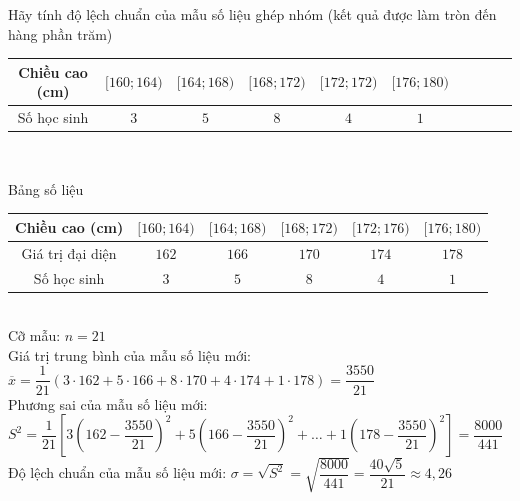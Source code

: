 \begin{ex}%
	Hãy tính độ lệch chuẩn của mẫu số liệu ghép nhóm (kết quả được làm tròn đến hàng phần trăm)\\
	\begin{tabular}{|c|c|c|c|c|c| c| c| c| c|  }
		\hline
		Chiều cao (cm) & $[160;164)$ & $[164;168)$ & $[168;172)$ & $[172;172)$ & $[176;180)$   \\
		\hline
		Số học sinh & $3$  & $5$       & $8$       & $4$       & $1$            \\
		\hline
	\end{tabular}\\
	\loigiai
	{ Bảng số liệu \\
		\begin{tabular}{|c|c|c|c|c|c|}
			\hline
			Chiều cao (cm) & $[160;164)$ & $[164;168)$ & $[168;172)$ & $[172;176)$ & $[176;180)$   \\
			\hline
			Giá trị đại diện & $162$  & $166$       & $170$       & $174$       & $178$            \\
			\hline
			Số học sinh & $3$  & $5$       & $8$       & $4$       & $1$            \\
			\hline
		\end{tabular}\\
		Cỡ mẫu: $n = 21$\\
		Giá trị trung bình của mẫu số liệu mới:\\
		$\overline x  =  \dfrac{1}{21}(3\cdot 162 + 5\cdot 166 + 8\cdot 170 + 4\cdot 174 + 1\cdot 178) = \dfrac{3550}{21}$\\
		
		Phương sai của mẫu số liệu mới:\\
		$S^2= \dfrac{1}{21}\left[ {3{{\left( {162 - \dfrac{{3550}}{{21}}} \right)}^2} + 5{{\left( {166 - \dfrac{{3550}}{{21}}} \right)}^2} +  \ldots  + 1{{\left( {178 - \dfrac{{3550}}{{21}}} \right)}^2}} \right] = \dfrac{8000}{441}$\\
		
		Độ lệch chuẩn của mẫu số liệu mới:
		$\sigma  = \sqrt {S^2}  = \sqrt {\dfrac{8000}{441}}  = \dfrac{40\sqrt 5 }{21} \approx 4{,}26$
		
	}
\end{ex}

